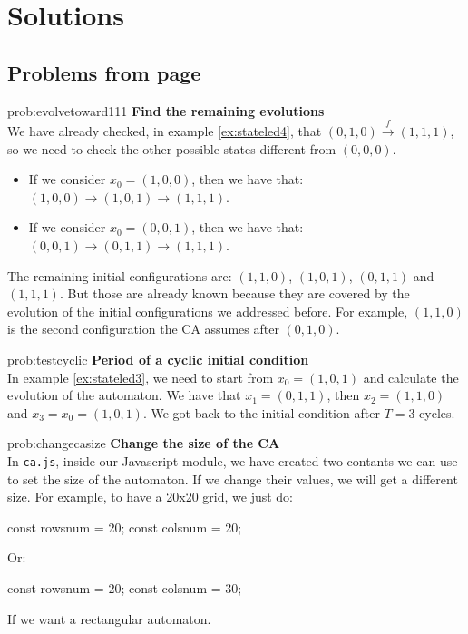 %
%
%

\chapter[Solutions]{Solutions}

\section*{Problems from page \pageref{sec:intro}}

\begin{sol}{prob:evolvetoward111}
\textbf{Find the remaining evolutions}\\
We have already checked, in example \ref{ex:stateled4}, that
$(0,1,0) \overset{f}{\rightarrow} (1,1,1)$, so we need to check the other possible
states different from $(0,0,0)$.
\begin{itemize}
\item If we consider $x_0 = (1,0,0)$, then we have that: $(1,0,0) \rightarrow (1,0,1) \rightarrow (1,1,1)$.
\item If we consider $x_0 = (0,0,1)$, then we have that: $(0,0,1) \rightarrow (0,1,1) \rightarrow (1,1,1)$.
\end{itemize}
The remaining initial configurations are: $(1,1,0)$, $(1,0,1)$, $(0,1,1)$ and $(1,1,1)$. But those are already
known because they are covered by the evolution of the initial configurations we addressed before. For example,
$(1,1,0)$ is the second configuration the CA assumes after $(0,1,0)$.
\end{sol}


\begin{sol}{prob:testcyclic}
\textbf{Period of a cyclic initial condition}\\
In example \ref{ex:stateled3}, we need to start from $x_0 = (1,0,1)$ and calculate the evolution of the automaton.
We have that $x_1 = (0,1,1)$, then $x_2 = (1,1,0)$ and $x_3 = x_ 0 = (1,0,1)$. We got back to the initial
condition after $T=3$ cycles.
\end{sol}

\begin{sol}{prob:changecasize}
\textbf{Change the size of the CA}\\
In \texttt{ca.js}, inside our Javascript module, we have created two contants we can use to set the size of the
automaton. If we change their values, we will get a different size. For example, to have a 20x20 grid,
we just do:
\begin{code}
const rowsnum = 20;
const colsnum = 20;
\end{code}
Or:
\begin{code}
const rowsnum = 20;
const colsnum = 30;
\end{code}
If we want a rectangular automaton.
\end{sol}

